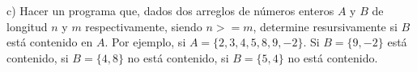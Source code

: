 {\color[rgb]{1,0,0}
c) Hacer un programa que, dados dos arreglos de números
enteros $A$ y $B$ de longitud $n$ y $m$ respectivamente, siendo
$n >= m$, determine resursivamente si $B$ está contenido en
$A$. Por ejemplo, si $A = \{2,3,4,5,8,9,-2\}$.
Si $B = \{9,-2\}$ está contenido, si $B = \{4,8\}$ no está
contenido, si $B = \{5,4\}$ no está contenido.
}